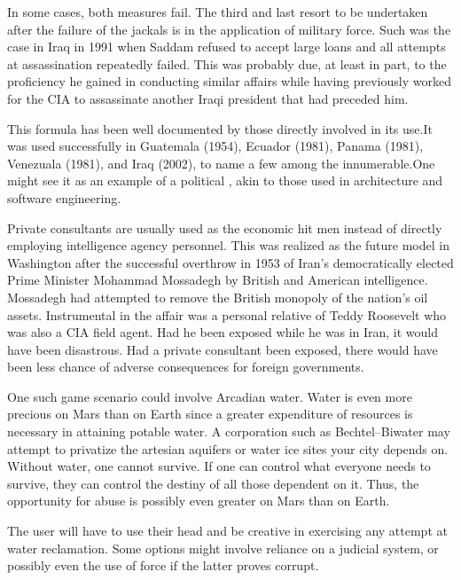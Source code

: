 In some cases, both measures fail. The third and last resort to be undertaken after the failure of the jackals is in the application of military force. Such was the case in Iraq in 1991 when Saddam refused to accept large loans and all attempts at assassination repeatedly failed. This was probably due, at least in part, to the proficiency he gained in conducting similar affairs while having previously worked for the CIA to assassinate another Iraqi president that had preceded him.

This formula has been well documented by those directly involved in its use.\footnotecite[perkins2005] It was used successfully in Guatemala (1954), Ecuador (1981), Panama (1981), Venezuala (1981), and Iraq (2002), to name a few among the innumerable. One might see it as an example of a political , akin to those used in architecture and software engineering.

Private consultants are usually used as the economic hit men instead of directly employing intelligence agency personnel. This was realized as the future model in Washington after the successful overthrow in 1953 of Iran's democratically elected Prime Minister Mohammad Mossadegh by British and American intelligence. Mossadegh had attempted to remove the British monopoly of the nation's oil assets. Instrumental in the affair was a personal relative of Teddy Roosevelt who was also a CIA field agent. Had he been exposed while he was in Iran, it would have been disastrous. Had a private consultant been exposed, there would have been less chance of adverse consequences for foreign governments.

One such game scenario could involve Arcadian water. Water is even more precious on Mars than on Earth since a greater expenditure of resources is necessary in attaining potable water. A corporation such as Bechtel--Biwater may attempt to privatize the artesian aquifers or water ice sites your city depends on. Without water, one cannot survive. If one can control what everyone needs to survive, they can control the destiny of all those dependent on it. Thus, the opportunity for abuse is possibly even greater on Mars than on Earth.

The user will have to use their head and be creative in exercising any attempt at water reclamation. Some options might involve reliance on a judicial system, or possibly even the use of force if the latter proves corrupt.

